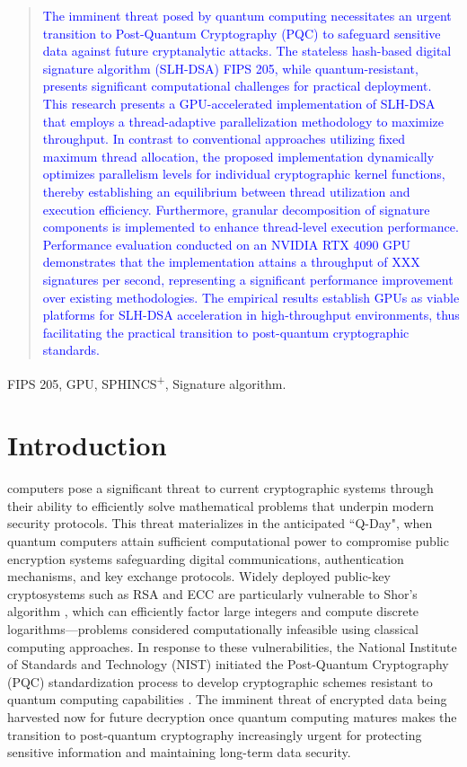 \documentclass[journal]{IEEEtran}
\begin{document}
\begin{abstract}
\textcolor{blue}{
The imminent threat posed by quantum computing necessitates an urgent transition to Post-Quantum Cryptography (PQC) to safeguard sensitive data against future cryptanalytic attacks.
The stateless hash-based digital signature algorithm (SLH-DSA) FIPS 205, while quantum-resistant, presents significant computational challenges for practical deployment.
This research presents a GPU-accelerated implementation of SLH-DSA that employs a thread-adaptive parallelization methodology to maximize throughput.
In contrast to conventional approaches utilizing fixed maximum thread allocation, the proposed implementation dynamically optimizes parallelism levels for individual cryptographic kernel functions, thereby establishing an equilibrium between thread utilization and execution efficiency.
Furthermore, granular decomposition of signature components is implemented to enhance thread-level execution performance.
Performance evaluation conducted on an NVIDIA RTX 4090 GPU demonstrates that the implementation attains a throughput of XXX signatures per second, representing a significant performance improvement over existing methodologies.
The empirical results establish GPUs as viable platforms for SLH-DSA acceleration in high-throughput environments, thus facilitating the practical transition to post-quantum cryptographic standards.
}
\end{abstract}

\begin{IEEEkeywords}
  FIPS 205, GPU, SPHINCS\textsuperscript{+}, Signature algorithm.
\end{IEEEkeywords}

\color{blue}

\section{Introduction}
\label{sec:intro}

 computers pose a significant threat to current cryptographic systems through their ability to efficiently solve mathematical problems that underpin modern security protocols. This threat materializes in the anticipated ``Q-Day", when quantum computers attain sufficient computational power to compromise public encryption systems safeguarding digital communications, authentication mechanisms, and key exchange protocols. Widely deployed public-key cryptosystems such as RSA and ECC are particularly vulnerable to Shor's algorithm \cite{Shor1994}, which can efficiently factor large integers and compute discrete logarithms—problems considered computationally infeasible using classical computing approaches. In response to these vulnerabilities, the National Institute of Standards and Technology (NIST) initiated the Post-Quantum Cryptography (PQC) standardization process to develop cryptographic schemes resistant to quantum computing capabilities \cite{NIST2016}. The imminent threat of encrypted data being harvested now for future decryption once quantum computing matures makes the transition to post-quantum cryptography increasingly urgent for protecting sensitive information and maintaining long-term data security.
\end{document}
